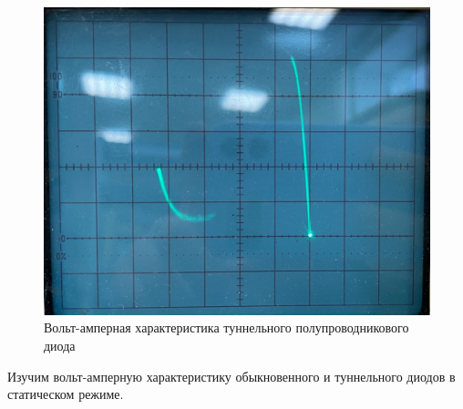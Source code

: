 \documentclass[a4paper,12pt]{article} %
\begin{document}
\begin{figure}[h!]
\begin{minipage}{0.45\textwidth}
  \includegraphics[width= \linewidth]{ваха_туннельный.jpg}
  \caption{Вольт-амперная характеристика туннельного полупроводникового диода}
  \label{fig:duffuse_polarization_degree_by_theta}

\end{minipage}
\end{figure}
Изучим вольт-амперную характеристику обыкновенного и туннельного диодов в статическом режиме.
\end{document}
